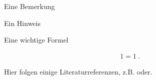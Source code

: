 

\begin{bemerkung}
	Eine Bemerkung
\end{bemerkung}

\begin{hinweis}
	Ein Hinweis
\end{hinweis}
Eine wichtige Formel
\begin{markeqn}
\begin{align}
1=1 \ .
\end{align}
\end{markeqn}

Hier folgen einige Literaturreferenzen, z.B. \cite{Henrich1993}
oder\cite{Witte1970}.
